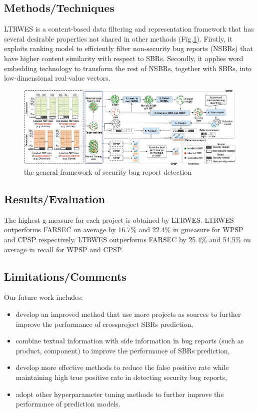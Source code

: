 \subsection{Methods/Techniques}
LTRWES is a content-based data filtering and representation framework that has several desirable properties not shared in other methods (Fig.\ref{fig:ltrwes}). 
Firstly, it exploits ranking model to efficiently filter non-security bug reports (NSBRs) that have higher content similarity with respect to SBRs. 			
Secondly, it applies word embedding technology to transform the rest of NSBRs, together with SBRs, into low-dimensional real-value vectors.
\begin{figure}[h]
    \centering
    \includegraphics[width=\linewidth]{ltrwes.jpg} %
    \caption{the general framework of security bug report detection}	
    \label{fig:ltrwes}
\end{figure}
\subsection{Results/Evaluation}
The highest g-measure for each project is obtained by LTRWES. LTRWES outperforms FARSEC on average by 16.7\% and 22.4\% in gmeasure for WPSP and CPSP respectively. 
LTRWES outperforms FARSEC by 25.4\% and 54.5\% on average in recall for WPSP and CPSP.
\subsection{Limitations/Comments}
Our future work includes: 
\begin{itemize}
\item  develop an improved method that use more projects as sources to further improve the performance of crossproject SBRs prediction, 
\item  combine textual information with side information in bug reports (such as product, component) to improve the performance of SBRs prediction, 
\item  develop more effective methods to reduce the false positive rate while maintaining high true positive rate in detecting security bug reports, 
\item  adopt other hyperparameter tuning methods to further improve the performance of prediction models.
\end{itemize}
\newpage

